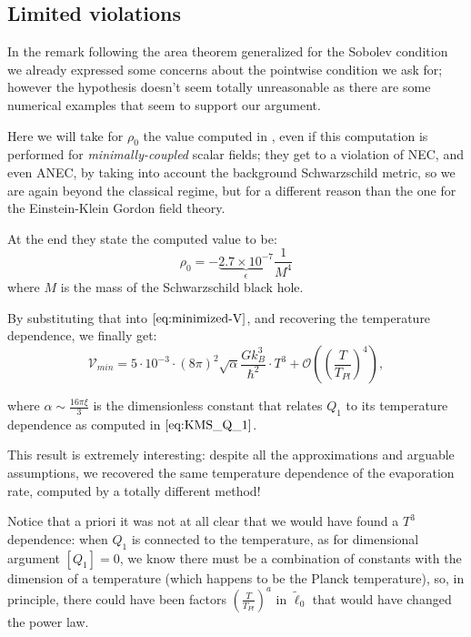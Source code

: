 \subsection{Limited violations}
\label{subsec:rho-0-estimation}
In the remark following the area theorem generalized for the Sobolev condition we already expressed some concerns about the pointwise condition we ask for; however the hypothesis doesn't seem totally unreasonable as there are some numerical examples that seem to support our argument.

Here we will take for \(\rho_0\) the value computed in \cite{levi2016versatile}, even if this computation is performed for \emph{minimally-coupled} scalar fields; they get to a violation of NEC, and even ANEC, by taking into account the background Schwarzschild metric, so we are again beyond the classical regime, but for a different reason than the one for the Einstein-Klein Gordon field theory.

At the end they state the computed value to be:
\[
\rho_0 = - \underbrace{\si{2.7\times10^{-7}}}_{\epsilon} \frac{1}{M^4}
\]
where \(M\) is the mass of the Schwarzschild black hole.

By substituting that into \(\eqref{eq:minimized-V}\), and recovering the temperature dependence, we finally get:
\begin{equation}
	\label{eq:KMS-minimized-V}
	\mathcal{V}_{min} = 5\cdot10^{-3} \cdot (8\pi)^2\sqrt{\alpha} \frac{Gk_B^3}{\hbar^2} \cdot T^3 + \mathcal{O}\left(\left(\frac{T}{T_{Pl}}\right)^4\right),
\end{equation}

where \(\alpha \sim \frac{16\pi\xi}{3}\) is the dimensionless constant that relates \(Q_1\) to its temperature dependence as computed in \(\eqref{eq:KMS_Q_1}\).

This result is extremely interesting: despite all the approximations and arguable assumptions, we recovered the same temperature dependence of the evaporation rate, computed by a totally different method! 

\begin{remark}
	Notice that a priori it was not at all clear that we would have found a \(T^3\) dependence: when \(Q_1\) is connected to the temperature, as for dimensional argument \(\left[Q_1\right] = 0\), we know there must be a combination of constants with the dimension of a temperature (which happens to be the Planck temperature), so, in principle, there could have been factors \(\left(\frac{T}{T_{Pl}}\right)^a\) in \(\tilde{\ell}_0\) that would have changed the power law.
\end{remark}

